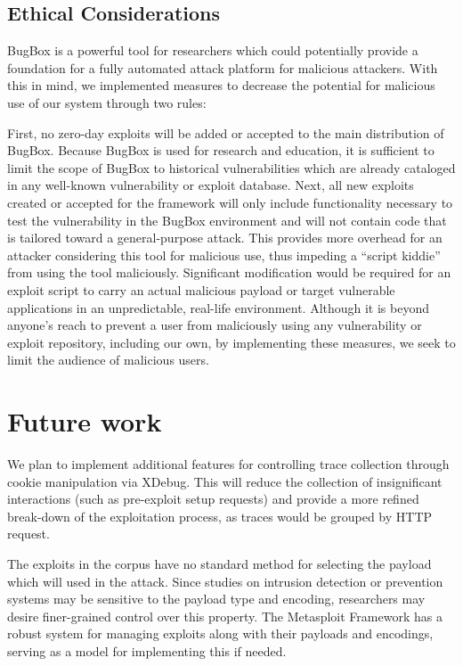 \documentclass[letterpaper,twocolumn,10pt]{article}
\begin{document}
\subsection {Ethical Considerations}
BugBox is a powerful tool for researchers which could potentially provide a foundation for a fully automated attack platform for malicious attackers.  With this in mind, we implemented measures to decrease the potential for malicious use of our system through two rules:

First, no zero-day exploits will be added or accepted to the main distribution of BugBox. Because BugBox is used for research and education, it is sufficient to limit the scope of BugBox to historical vulnerabilities which are already cataloged in any well-known vulnerability or exploit database.
Next, all new exploits created or accepted for the framework will only include functionality necessary to test the vulnerability in the BugBox environment and will not contain code that is tailored toward a general-purpose attack.  This provides more overhead for an attacker considering this tool for malicious use, thus impeding a ``script kiddie'' from using the tool maliciously.  Significant modification would be required for an exploit script to carry an actual malicious payload or target vulnerable applications in an unpredictable, real-life environment.
Although it is beyond anyone's reach to prevent a user from maliciously using any vulnerability or exploit repository, including our own, by implementing these measures, we seek to limit the audience of malicious users.

\section{Future work}
We plan to implement additional features for controlling trace collection through cookie manipulation via XDebug. This will reduce the collection of insignificant interactions (such as pre-exploit setup requests) and provide a more refined break-down of the exploitation process, as traces would be grouped by HTTP request.

The exploits in the corpus have no standard method for selecting the payload which will used in the attack. Since studies on intrusion detection or prevention systems may be sensitive to the payload type and encoding, researchers may desire finer-grained control over this property. The Metasploit Framework has a robust system for managing exploits along with their payloads and encodings, serving as a model for implementing this if needed.
\end{document}
